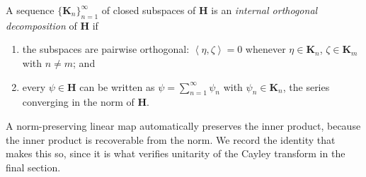 \begin{definition}
    \label{def:internal-orthogonal-decomposition}
    \leanok
    A sequence $\{ \mathbf{K}_n \}_{n=1}^\infty$ of closed subspaces of $\mathbf{H}$ is an \textit{internal orthogonal decomposition} of $\mathbf{H}$ if
    \begin{enumerate}
        \item the subspaces are pairwise orthogonal: $\left< \eta, \zeta \right> = 0$ whenever $\eta \in \mathbf{K}_n$, $\zeta \in \mathbf{K}_m$ with $n \ne m$; and
        \item every $\psi \in \mathbf{H}$ can be written as $\psi = \sum_{n=1}^\infty \psi_n$ with $\psi_n \in \mathbf{K}_n$, the series converging in the norm of $\mathbf{H}$.
    \end{enumerate}
\end{definition}

A norm-preserving linear map automatically preserves the inner product, because the inner product is recoverable from the norm. We record the identity that makes this so, since it is what verifies unitarity of the Cayley transform in the final section.


